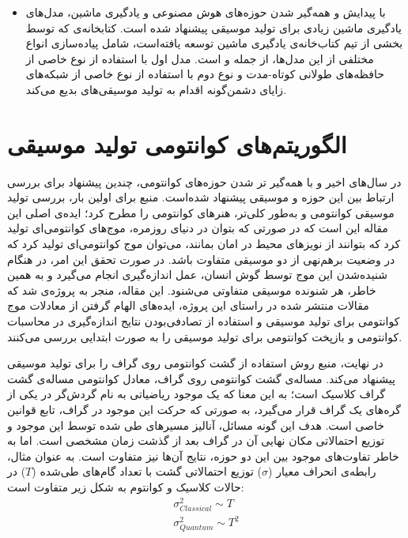 \begin{itemize}
\item 
با پیدایش و همه‌گیر شدن حوزه‌های هوش مصنوعی و یادگیری ماشین، مدل‌های یادگیری ماشین زیادی برای تولید موسیقی پیشنهاد شده است.
کتابخانه‌ی 
که توسط بخشی از تیم کتاب‌خانه‌ی یادگیری ماشین
توسعه یافته‌است، شامل پیاده‌سازی انواع مختلفی از این مدل‌ها، از جمله
\cite{magenta_melodyrnn}
و
\cite{magenta_gansynth}
است. مدل اول با استفاده از نوع خاصی از حافظه‌های طولانی کوتاه-مدت
و نوع دوم با استفاده از نوع خاصی از شبکه‌های زایای دشمن‌گونه اقدام به تولید موسیقی‌های بدیع می‌کند.
\end{itemize}

\section{الگوریتم‌های کوانتومی تولید موسیقی}

در سال‌های اخیر و با همه‌گیر تر شدن حوزه‌های کوانتومی، چندین پیشنهاد برای بررسی ارتباط بین این حوزه و موسیقی پیشنهاد شده‌است. منبع
\cite{Putz_quantum_music}
برای اولین بار، بررسی تولید موسیقی کوانتومی
و به‌طور کلی‌تر، هنرهای کوانتومی
را مطرح کرد؛ ایده‌ی اصلی این مقاله این است که در صورتی که بتوان در دنیای روزمره، موج‌های کوانتومی‌ای تولید کرد که بتوانند از نویزهای محیط در امان بمانند، می‌توان موج کوانتومی‌ای تولید کرد که در وضعیت برهم‌نهی از دو موسیقی متفاوت باشد. در صورت تحقق این امر، در هنگام شنیده‌شدن این موج توسط گوش انسان، عمل اندازه‌گیری انجام می‌گیرد و به همین خاطر، هر شنونده موسیقی متفاوتی می‌شنود.
این مقاله، منجر به پروژه‌ی
\cite{quantum_music_event}
شد که مقالات منتشر شده در راستای این پروژه، ایده‌های الهام گرفتن از معادلات موج کوانتومی برای تولید موسیقی
\cite{Helweg_QInspired_Music}
و استفاده از تصادفی‌بودن نتایج اندازه‌گیری در محاسبات کوانتومی و بازپخت کوانتومی
برای تولید موسیقی
\cite{Kirke_QC_Music}
را به صورت ابتدایی بررسی می‌کنند.

در نهایت، منبع
\cite{miranda}
روش استفاده از گشت کوانتومی
روی گراف را
برای تولید موسیقی پیشنهاد می‌کند.
مساله‌ی گشت کوانتومی روی گراف، معادل کوانتومی مساله‌ی گشت گراف کلاسیک است؛ به این معنا که یک موجود ریاضیاتی به نام گردش‌گر
در یکی از گره‌های یک گراف قرار می‌گیرد، به صورتی که حرکت این موجود در گراف، تابع قوانین خاصی است. هدف این گونه مسائل، آنالیز مسیرهای طی شده توسط این موجود و توزیع احتمالاتی
مکان نهایی آن در گراف بعد از گذشت زمان مشخصی است.
اما به خاطر تفاوت‌های موجود بین این دو حوزه، نتایج آن‌ها نیز متفاوت است.
\cite{Kempe_qwalk}
به عنوان مثال، رابطه‌ی انحراف معیار
($\sigma$)
توزیع احتمالاتی گشت با تعداد گام‌های طی‌شده
($T$)
در حالات کلاسیک و کوانتوم به شکل زیر متفاوت است:
\begin{equation}
\begin{gathered}
    \sigma^2_{Classical} \sim T \\[3pt]
    \sigma^2_{Quantum} \sim T^2
\end{gathered}
\end{equation}

